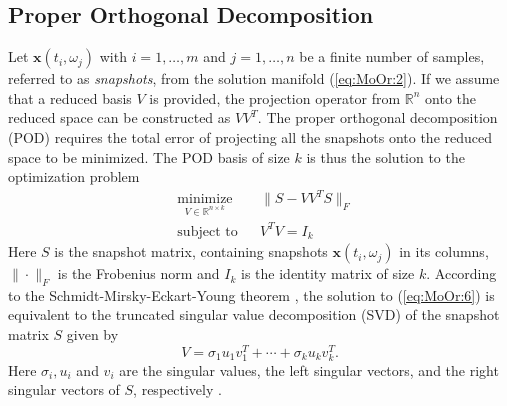 \subsection{Proper Orthogonal Decomposition} \label{chap:MoOr.PrOr:1}
Let $\mathbf x (t_i,\omega_j)$ with $i=1,\dots,m$ and $j=1,\dots,n$ be a finite number of samples, referred to as \emph{snapshots}, from the solution manifold (\ref{eq:MoOr:2}). If we {\edit assume} that a reduced basis $V$ is provided, the projection operator from $\mathbb R^n$ onto the reduced space can be constructed as $VV^T$. The proper orthogonal decomposition (POD) requires the total error of projecting all the snapshots onto the reduced space to be {\edit minimized}. The POD basis of size $k$ is thus the solution to the optimization problem
\begin{equation} \label{eq:MoOr:6}
\begin{aligned}
& \underset{V\in \mathbb R^{n\times k}}{\text{minimize}}
& & \| S - VV^TS\|_F \\
& \text{subject to}
& & V^TV = I_k
\end{aligned}
\end{equation}
Here $S$ is the snapshot matrix, containing snapshots $\mathbf x(t_i,\omega_j)$ in its columns, $\|\cdot \|_F$ is the Frobenius norm and $I_k$ is the identity matrix of size $k$. According to {\blue the} {\edit Schmidt-Mirsky-Eckart-Young theorem \cite{Markovsky:2011:LRA:2103589}}, the solution to (\ref{eq:MoOr:6}) is equivalent to the truncated singular value decomposition (SVD) of the snapshot matrix $S$ given by
\begin{equation} \label{eq:MoOr:7}
	V = \sigma_1 u_1 v^T_1 + \cdots + \sigma_k u_k v^T_k.
\end{equation}
Here $\sigma_i, u_i$ and $v_i$ are the singular values, the left singular vectors, and the right singular vectors of $S$, respectively {\edit \cite{Markovsky:2011:LRA:2103589} }.



